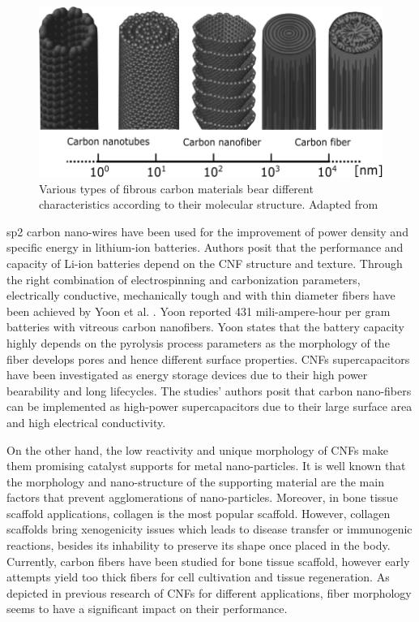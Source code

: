 \begin{figure}[!th]
\centering
\includegraphics[scale=0.65]{./Figures/carbonFiberDiameterComparison.png}
\decoRule
\caption[Diameter comparison of various types of fibrous carbon materials]{Various types of fibrous carbon materials bear different characteristics according to their molecular structure. Adapted from \cite{Vajtai2013}}
\label{fig:diameterComparisonOfCarbonFibers}
\end{figure}

sp2 carbon nano-wires have been used for the improvement of power density and specific energy in lithium-ion batteries. \cite{Frackowiak2002, Endo2000, Winter1998} Authors posit that the performance and capacity of Li-ion batteries depend on the CNF structure and texture. Through the right combination of electrospinning and carbonization parameters, electrically conductive, mechanically tough and with thin diameter fibers have been achieved by Yoon et al. \cite{Yoon2004}. Yoon reported 431 mili-ampere-hour per gram batteries with vitreous carbon nanofibers. Yoon states that the battery capacity highly depends on the pyrolysis process parameters as the morphology of the fiber develops pores and hence different surface properties. CNFs supercapacitors have been investigated as energy storage devices due to their high power bearability and long lifecycles. \cite{Endo2001, Frackowiak2001, Pandolfo2006, Conway1999} The studies' authors posit that carbon nano-fibers can be implemented as high-power supercapacitors due to their large surface area and high electrical conductivity.

On the other hand, the low reactivity and unique morphology of CNFs make them promising catalyst supports for metal nano-particles. \cite{Choi2002, Li2002, Planeix1994} It is well known that the morphology and nano-structure of the supporting material are the main factors that prevent agglomerations of nano-particles. \cite{RomanMartinez1995, Serp2008} Moreover, in bone tissue scaffold applications, collagen is the most popular scaffold. However, collagen scaffolds bring xenogenicity issues which leads to disease transfer or immunogenic reactions, besides its inhability to preserve its shape once placed in the body. \cite{Bach1998, Butler1998, Delustro1990, Chachques2008, Atala2006, Glowacki2008, Valarmathi2008, Faraj2007} Currently, carbon fibers have been studied for bone tissue scaffold, however early attempts yield too thick fibers for cell cultivation and tissue regeneration. \cite{Visuri1991, Parsons1989} As depicted in previous research of CNFs for different applications, fiber morphology seems to have a significant impact on their performance. 


